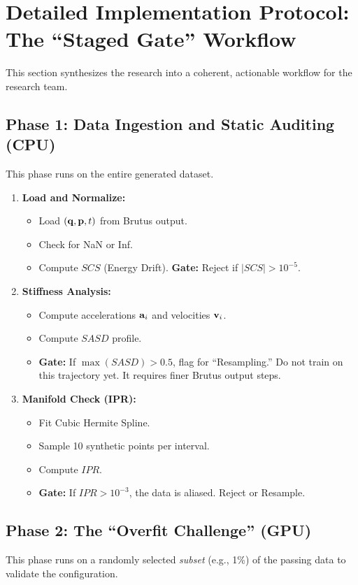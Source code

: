 \section{Detailed Implementation Protocol: The ``Staged Gate'' Workflow}

This section synthesizes the research into a coherent, actionable workflow for the research team.

\subsection{Phase 1: Data Ingestion and Static Auditing (CPU)}
This phase runs on the entire generated dataset.

\begin{enumerate}
    \item \textbf{Load and Normalize:}
    \begin{itemize}
        \item Load $(\mathbf{q}, \mathbf{p}, t)$ from Brutus output.
        \item Check for NaN or Inf.
        \item Compute $SCS$ (Energy Drift). \textbf{Gate:} Reject if $|SCS| > 10^{-5}$.
    \end{itemize}
    \item \textbf{Stiffness Analysis:}
    \begin{itemize}
        \item Compute accelerations $\mathbf{a}_i$ and velocities $\mathbf{v}_i$.
        \item Compute $SASD$ profile.
        \item \textbf{Gate:} If $\max(SASD) > 0.5$, flag for ``Resampling.'' Do not train on this trajectory yet. It requires finer Brutus output steps.
    \end{itemize}
    \item \textbf{Manifold Check (IPR):}
    \begin{itemize}
        \item Fit Cubic Hermite Spline.
        \item Sample 10 synthetic points per interval.
        \item Compute $IPR$.
        \item \textbf{Gate:} If $IPR > 10^{-3}$, the data is aliased. Reject or Resample.
    \end{itemize}
\end{enumerate}

\subsection{Phase 2: The ``Overfit Challenge'' (GPU)}
This phase runs on a randomly selected \textit{subset} (e.g., 1\%) of the passing data to validate the configuration.

